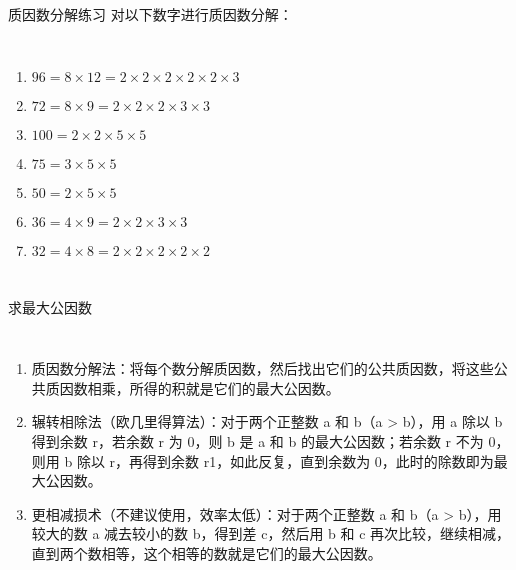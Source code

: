 \documentclass[aspectratio=169]{ctexbeamer} %
\begin{document}
\begin{frame}[t]{质因数分解练习}
对以下数字进行质因数分解：
\begin{columns}
\begin{enumerate}[label={\arabic*.}]
\item $96  = 8 \times 12 = 2 \times 2 \times 2 \times 2 \times 2 \times 3$
\item $72  = 8 \times 9 = 2 \times 2 \times 2 \times 3 \times 3$
\item $100  = 2 \times 2 \times 5 \times 5$
\item $75  = 3 \times 5 \times 5$
\item $50  = 2 \times 5 \times 5$
\item $36  = 4 \times 9 = 2 \times 2 \times 3 \times 3$
\item $32  = 4 \times 8 = 2 \times 2 \times 2 \times 2 \times 2$
\end{enumerate}
\end{columns}
\end{frame}

\begin{frame}[t]{求最大公因数}
\begin{columns}
\begin{enumerate}[label={\arabic*.}]
\item \alert{质因数分解法：}将每个数分解质因数，然后找出它们的公共质因数，将这些公共质因数相乘，所得的积就是它们的最大公因数。
\item \alert{辗转相除法（欧几里得算法）：}对于两个正整数 a 和 b（a > b），用 a 除以 b 得到余数 r，若余数 r 为 0，则 b 是 a 和 b 的最大公因数；若余数 r 不为 0，则用 b 除以 r，再得到余数 r1，如此反复，直到余数为 0，此时的除数即为最大公因数。
\item \alert{更相减损术（不建议使用，效率太低）：}对于两个正整数 a 和 b（a > b），用较大的数 a 减去较小的数 b，得到差 c，然后用 b 和 c 再次比较，继续相减，直到两个数相等，这个相等的数就是它们的最大公因数。
\end{enumerate}
\end{columns}
\end{frame}
\end{document}
